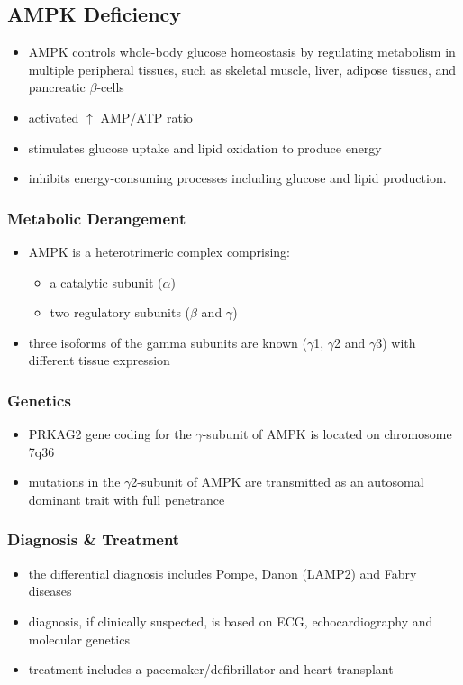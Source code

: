 \documentclass{scrartcl}
\begin{document}
\subsection{AMPK Deficiency}
\label{sec:org217d75a}
\begin{itemize}
\item AMPK controls whole-body glucose homeostasis by regulating metabolism in multiple peripheral tissues, such as
skeletal muscle, liver, adipose tissues, and pancreatic \(\beta\)-cells
\item activated \(\uparrow\) AMP/ATP ratio
\item stimulates glucose uptake and lipid oxidation to produce energy
\item inhibits energy-consuming processes including glucose and lipid production.
\end{itemize}

\subsubsection{Metabolic Derangement}
\label{sec:org6dc6821}
\begin{itemize}
\item AMPK is a heterotrimeric complex comprising:
\begin{itemize}
\item a catalytic subunit (\(\alpha\))
\item two regulatory subunits (\(\beta\) and \(\gamma\))
\end{itemize}
\item three isoforms of the gamma subunits are known (\(\gamma\)1, \(\gamma\)2 and \(\gamma\)3) with different tissue
expression
\end{itemize}

\subsubsection{Genetics}
\label{sec:org370e80c}
\begin{itemize}
\item PRKAG2 gene coding for the \(\gamma\)-subunit of AMPK is located on chromosome 7q36
\item mutations in the \(\gamma\)2-subunit of AMPK are transmitted as an
autosomal dominant trait with full penetrance
\end{itemize}

\subsubsection{Diagnosis \& Treatment}
\label{sec:org141b991}
\begin{itemize}
\item the differential diagnosis includes Pompe, Danon (LAMP2) and Fabry diseases
\item diagnosis, if clinically suspected, is based on ECG,
echocardiography and molecular genetics
\item treatment includes a pacemaker/defibrillator and heart transplant
\end{itemize}
\end{document}
